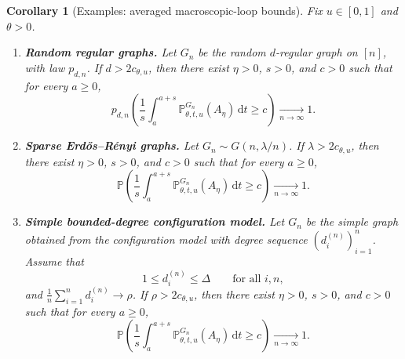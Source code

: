 \documentclass[11pt]{article}
\newtheorem{corollary}[theorem]{Corollary}
\theoremstyle{remark}
\theoremstyle{plain}
\newcommand{\Pbb}{\mathbb{P}}
\newcommand{\1}{\mathbbm{1}}
\newcommand{\dd}{\mathrm{d}}
\begin{document}
\begin{corollary}[Examples: averaged macroscopic-loop bounds]
\label{cor:examples-averaged}
Fix \(u\in[0,1]\) and \(\theta>0\).

\begin{enumerate}[label=\textnormal{(\roman*)}]
    \item \textbf{Random regular graphs.}
    Let \(G_n\) be the random \(d\)-regular graph on \([n]\), with law \(p_{d,n}\).
    If $d>2c_{\theta,u}$, then there exist \(\eta>0\), \(s>0\), and \(c>0\) such that for every \(a\ge 0\),
    \[
    p_{d,n}\!\left(
    \frac1s\int_a^{a+s}\Pbb^{G_n}_{\theta,t,u}(A_\eta)\,\dd t \ge c
    \right)\xrightarrow[n\to\infty]{}1.
    \]

    \item \textbf{Sparse Erd\H{o}s--R\'enyi graphs.}
    Let \(G_n\sim G(n,\lambda/n)\). If $\lambda>2c_{\theta,u}$,
    then there exist \(\eta>0\), \(s>0\), and \(c>0\) such that for every \(a\ge 0\),
    \[
    \Pbb\!\left(
    \frac1s\int_a^{a+s}\Pbb^{G_n}_{\theta,t,u}(A_\eta)\,\dd t \ge c
    \right)\xrightarrow[n\to\infty]{}1.
    \]

    \item \textbf{Simple bounded-degree configuration model.}
    Let \(G_n\) be the simple graph obtained from the configuration model with
    degree sequence \((d_i^{(n)})_{i=1}^n\). Assume that
    \[
    1\le d_i^{(n)}\le \Delta
    \qquad\text{for all }i,n,
    \]
    and $\frac1n\sum_{i=1}^n d_i^{(n)}\to \rho$. If $\rho>2c_{\theta,u}$,
    then there exist \(\eta>0\), \(s>0\), and \(c>0\) such that for every \(a\ge 0\),
    \[
    \Pbb\!\left(
    \frac1s\int_a^{a+s}\Pbb^{G_n}_{\theta,t,u}(A_\eta)\,\dd t \ge c
    \right)\xrightarrow[n\to\infty]{}1.
    \]
\end{enumerate}
\end{corollary}
\end{document}
